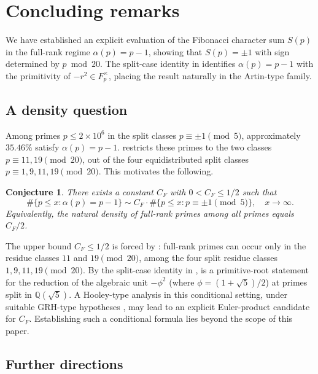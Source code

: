 \documentclass[preprint,5p,times,twocolumn]{elsarticle}
\def\F{F}\def\Z{Z}\def\Q{Q}\def\R{R}\def\N{N}%
\newtheorem{conjecture}[theorem]{Conjecture}
\newcommand{\Z}{\mathbb{Z}}
\newcommand{\Q}{\mathbb{Q}}
\newcommand{\R}{\mathbb{R}}
\newcommand{\F}{\mathbb{F}}
\newcommand{\N}{\mathbb{N}}
\begin{document}
\section{Concluding remarks}\label{sec:conclusion}

We have established an explicit evaluation of the Fibonacci 
character sum $S(p)$ in the full-rank regime $\alpha(p)=p-1$, 
showing that $S(p)=\pm1$ with sign determined by $p\bmod20$. 
The split-case identity in  identifies 
$\alpha(p)=p-1$ with the primitivity of $-r^2\in\F_p^\times$, 
placing the result naturally in the Artin-type family.

\subsection*{A density question}

Among primes $p\le2\times10^6$ in the split classes 
$p\equiv\pm1\pmod5$, approximately $35.46\%$ satisfy 
$\alpha(p)=p-1$.  restricts these primes to 
the two classes $p\equiv11,19\pmod{20}$, out of the four 
equidistributed split classes $p\equiv1,9,11,19\pmod{20}$. 
This motivates the following.

\begin{conjecture}\label{conj:density}
There exists a constant $C_F$ with $0<C_F\le 1/2$ such that
\[
\#\{p\le x:\alpha(p)=p-1\}\sim 
C_F\cdot\#\{p\le x:p\equiv\pm 1\pmod 5\},\quad x\to\infty.
\]
Equivalently, the natural density of full-rank primes among 
all primes equals $C_F/2$.
\end{conjecture}

The upper bound \(C_F\le 1/2\) is forced by :
full-rank primes can occur only in the residue classes
\(11\) and \(19\pmod{20}\), among the four split residue classes
\(1,9,11,19\pmod{20}\). By the split-case identity in
,  is a primitive-root
statement for the reduction of the algebraic unit \(-\phi^2\)
(where \(\phi=(1+\sqrt5)/2\)) at primes split in
\(\mathbb{Q}(\sqrt5)\). A Hooley-type analysis in this conditional
setting, under suitable GRH-type hypotheses \cite{Hooley1967,Moree2012},
may lead to an explicit Euler-product candidate for \(C_F\).
Establishing such a conditional formula lies beyond the scope of
this paper.

\subsection*{Further directions}
\end{document}
